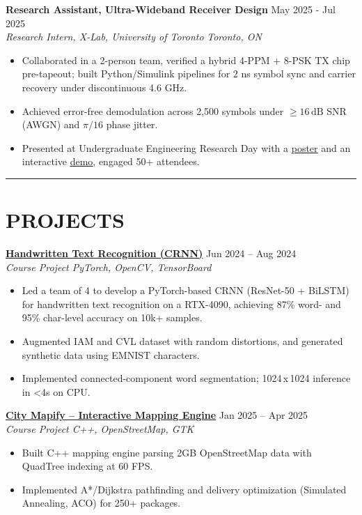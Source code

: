 \documentclass[letterpaper,10pt]{article}
\begin{document}
\vspace{0.2em}
\noindent
\textbf{Research Assistant, Ultra-Wideband Receiver Design} \hfill May 2025 - Jul 2025\\
\textit{Research Intern, X-Lab, University of Toronto} \hfill \textit{Toronto, ON}
\begin{itemize}[leftmargin=0.2in]
    \item Collaborated in a 2-person team, verified a hybrid 4-PPM + 8-PSK TX chip pre-tapeout; built Python/Simulink pipelines for 2 ns symbol sync and carrier recovery under discontinuous 4.6 GHz.
    \item Achieved error-free demodulation across 2,500 symbols under $\geq 16\,\mathrm{dB}$ SNR (AWGN) and $\pi/16$ phase jitter.
    \item Presented at Undergraduate Engineering Research Day with a \href{https://docs.google.com/presentation/d/1h4lmc_HQLzNvtGE4oE1jedOlNVZjL3iztEyGKnC-ico/edit?usp=sharing}{\uline{poster}} and an interactive \href{https://github.com/Ken-2511/ppm-psk-visualize}{\uline{demo}}, engaged 50+ attendees.
\end{itemize}

\noindent\rule{\linewidth}{1pt}

\section*{\textbf{PROJECTS}}
\noindent\href{https://github.com/Ken-2511/HandwritingRecognition}{\uline{\textbf{Handwritten Text Recognition (CRNN)}}} \hfill Jun 2024 -- Aug 2024\\
\textit{Course Project \textbar{} PyTorch, OpenCV, TensorBoard}
\begin{itemize}
    \item Led a team of 4 to develop a PyTorch-based CRNN (ResNet-50 + BiLSTM) for handwritten text recognition on a RTX-4090, achieving 87\% word- and 95\% char-level accuracy on 10k+ samples.
    \item Augmented IAM and CVL dataset with random distortions, and generated synthetic data using EMNIST characters.
    \item Implemented connected-component word segmentation; 1024\,x\,1024 inference in \textless 4s on CPU.
\end{itemize}

\vspace{0.2em}
\noindent\href{https://github.com/Ken-2511/city-mapify}{\uline{\textbf{City Mapify – Interactive Mapping Engine}}} \hfill Jan 2025 -- Apr 2025\\
\textit{Course Project \textbar{} C++, OpenStreetMap, GTK}
\begin{itemize}
	\item Built C++ mapping engine parsing 2GB OpenStreetMap data with QuadTree indexing at 60 FPS.
	\item Implemented A*/Dijkstra pathfinding and delivery optimization (Simulated Annealing, ACO) for 250+ packages.
\end{itemize}
\end{document}
